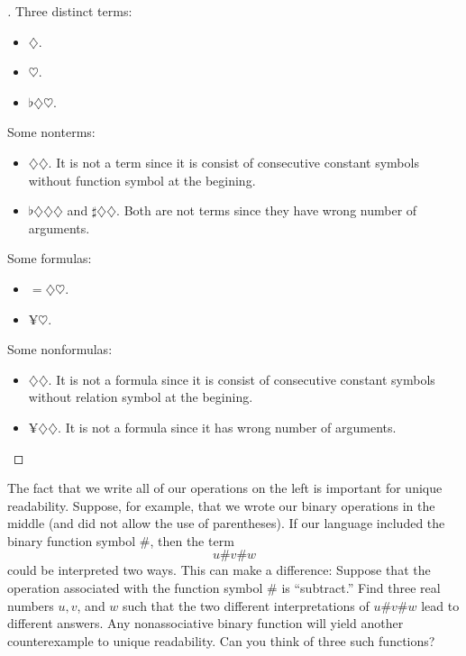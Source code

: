 \begin{proof}[]
  Three distinct terms:
  \begin{itemize}
    \item \(\diamondsuit\).
    \item \(\heartsuit\).
    \item \(\flat \diamondsuit \heartsuit\).
  \end{itemize}
  Some nonterms:
  \begin{itemize}
    \item \(\diamondsuit \diamondsuit\).
          It is not a term since it is consist of consecutive constant symbols without function symbol at the begining.
    \item \(\flat \diamondsuit \diamondsuit \diamondsuit\) and \(\sharp \diamondsuit \diamondsuit\).
          Both are not terms since they have wrong number of arguments.
  \end{itemize}
  Some formulas:
  \begin{itemize}
    \item \(= \diamondsuit \heartsuit\).
    \item \(\yen \heartsuit\).
  \end{itemize}
  Some nonformulas:
  \begin{itemize}
    \item \(\diamondsuit \diamondsuit\).
          It is not a formula since it is consist of consecutive constant symbols without relation symbol at the begining.
    \item \(\yen \diamondsuit \diamondsuit\).
          It is not a formula since it has wrong number of arguments.
  \end{itemize}
\end{proof}

\begin{ex}\label{ex:1.3.2}
  The fact that we write all of our operations on the left is important for unique readability.
  Suppose, for example, that we wrote our binary operations in the middle (and did not allow the use of parentheses).
  If our language included the binary function symbol \(\#\), then the term
  \[
    u \# v \# w
  \]
  could be interpreted two ways.
  This can make a difference:
  Suppose that the operation associated with the function symbol \(\#\) is ``subtract.''
  Find three real numbers \(u, v\), and \(w\) such that the two different interpretations of \(u \# v \# w\) lead to different answers.
  Any nonassociative binary function will yield another counterexample to unique readability.
  Can you think of three such functions?
\end{ex}

